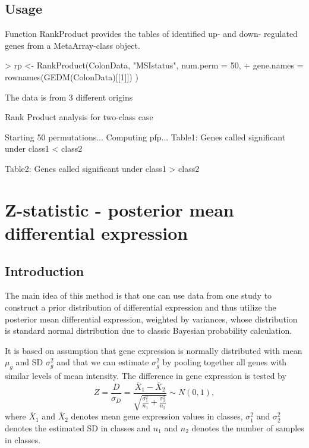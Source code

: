 \documentclass[a4paper]{report}
\begin{document}
\section*{Usage}
Function {\ttfamily RankProduct} provides the tables of identified up- and down- regulated genes from a MetaArray-class object.
\begin{Schunk}
\begin{Sinput}
> rp <- RankProduct(ColonData, "MSIstatus", num.perm = 50,
+  gene.names = rownames(GEDM(ColonData)[[1]]) )
\end{Sinput}
\begin{Soutput}
 The data is from  3 different origins 
 
Rank Product analysis for two-class case 
 
Starting  50 permutations... 
Computing pfp... 
Table1: Genes called significant under class1 < class2 

Table2: Genes called significant under class1 > class2 
\end{Soutput}
\end{Schunk}

\chapter{Z-statistic - posterior mean differential expression}
\section*{Introduction}
The main idea of this method is that one can use data from one study to construct a prior distribution of differential expression and thus utilize the posterior mean differential expression, weighted by variances, whose distribution is standard normal distribution due to classic Bayesian probability calculation. \par
It is based on assumption that gene expression is normally distributed with mean $\mu_g $ and SD $\sigma^2_g$ and that we can estimate $\sigma^2_g$ by pooling together all genes with similar levels of mean intensity. The difference in gene expression is tested by
\[ Z=\frac{D}{\sigma_D}=\frac{\overline{X}_1 - \overline{X}_2}{\sqrt{\frac{\sigma_1^2}{n_1}+\frac{\sigma_2^2}{n_2}}} \sim N(0,1),\]
where $\overline{X}_1$ and $\overline{X}_2$ denotes mean gene expression values in classes, $\sigma_1^2$ and $\sigma_2^2$ denotes the estimated SD in classes and $n_1$ and $n_2$ denotes the number of samples in classes. 
\end{document}
